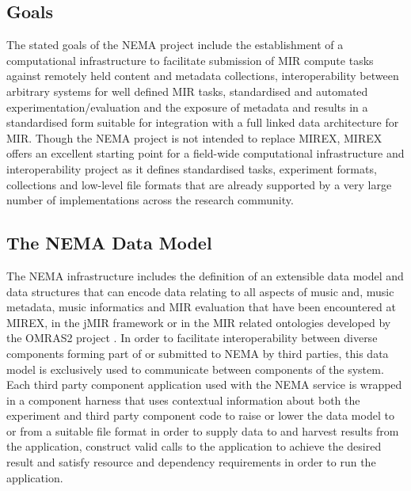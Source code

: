 \documentclass[conference]{IEEEtran}
\begin{document}
\subsection{Goals}
The stated goals of the NEMA project include the establishment of a computational infrastructure to facilitate submission of MIR compute tasks against remotely held content and metadata collections, interoperability between arbitrary systems for well defined MIR tasks, standardised and automated experimentation/evaluation and the exposure of metadata and results in a standardised form suitable for integration with a full linked data architecture for MIR. 
Though the NEMA project is not intended to replace MIREX, MIREX offers an excellent starting point for a field-wide computational infrastructure and interoperability project as it defines standardised tasks, experiment formats, collections and low-level file formats that are already supported by a very large number of implementations across the research community. 


\subsection{The NEMA Data Model}
The NEMA infrastructure includes the definition of an extensible data model and data structures that can encode data relating to all aspects of music and, music metadata, music informatics and MIR evaluation that have been encountered at MIREX, in the jMIR framework \cite{mckay2009jmir} or in the MIR related ontologies developed by the OMRAS2 project \cite{raimond2007music}. In order to facilitate interoperability between diverse components forming part of or submitted to NEMA by third parties, this data model is exclusively used to communicate between components of the system. 
Each third party component application used with the NEMA service is wrapped in a component harness that uses contextual information about both the experiment and third party component code to raise or lower the data model to or from a suitable file format in order to supply data to and harvest results from the application, construct valid calls to the application to achieve the desired result and satisfy resource and dependency requirements in order to run the application.  
\end{document}
